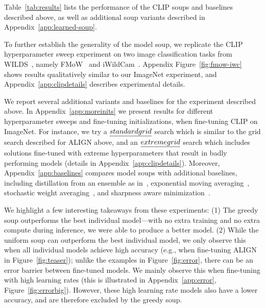 \documentclass[nohyperref]{article}
\theoremstyle{plain}
\theoremstyle{definition}
\theoremstyle{remark}
\begin{document}
        Table~\ref{tab:results} lists the performance of the CLIP soups and baselines described above, as well as additional soup variants described in Appendix~\ref{app:learned-soup}.
        
        To further establish the generality of the model soup, we replicate the CLIP hyperparameter sweep experiment on two image classification tasks from WILDS~\cite{wilds2021}, namely FMoW~\cite{christie2018functional} and iWildCam~\cite{beery2021iwildcam}. Appendix Figure~\ref{fig:fmow-iwc} shows results  qualitatively similar to our ImageNet experiment, and Appendix~\ref{app:clipdetails} describes experimental details. 
        
        We report several additional variants and baselines for the experiment described above. In Appendix~\ref{app:moreinits} we present results for different hyperparameter sweeps and fine-tuning initializations, when fine-tuning CLIP on ImageNet. 
        For instance, we try a $\emph{standard grid}$ search which is similar to the
        grid search described for ALIGN above, and an $\emph{extreme grid}$ search which includes
        solutions fine-tuned with extreme hyperparameters that result in badly performing models (details in Appendix~\ref{app:clipdetails}).
        Moreover, Appendix~\ref{app:baselines}
        compares model soups with additional
        baselines, including distillation from
        an ensemble as in~\citet{hinton2014dark},
        exponential moving averaging~\cite{szegedy2016rethinking}, stochastic weight averaging~\cite{izmailov2018averaging}, and sharpness aware
        minimization~\cite{foret2021sharpnessaware}.
        
        We highlight a few interesting takeaways from these experiments:
        (1) The greedy soup outperforms the best individual model---with no extra training and no extra compute
        during inference, we were able to produce a better model.
        (2) While the
        uniform soup can outperform the best individual model, we only observe this when all individual
        models achieve high accuracy (e.g., when fine-tuning ALIGN in Figure~\ref{fig:teaser}); 
        unlike the examples in Figure~\ref{fig:error}, there can be an error barrier between fine-tuned models.
        We mainly observe this when fine-tuning with high learning rates (this is illustrated in Appendix~\ref{app:error}, Figure~\ref{fig:errorbig}).
        However, these high learning rate models also have a lower accuracy,
        and are therefore excluded by the greedy soup.
        
\end{document}
